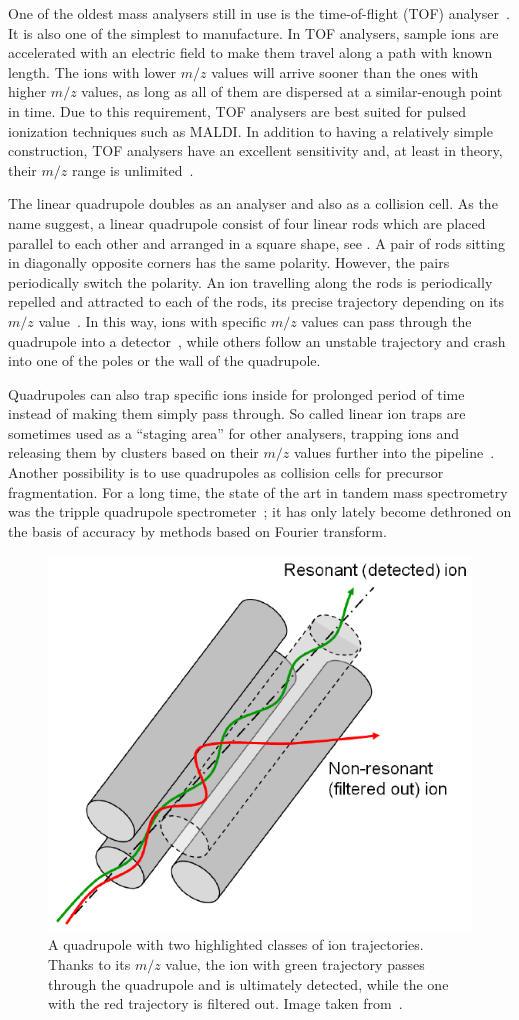 One of the oldest mass analysers still in use is the time-of-flight (TOF) analyser~\cite{stephens1946pulsed}. It is also one of the simplest to manufacture. In TOF analysers, sample ions are accelerated with an electric field to make them travel along a path with known length. The ions with lower \(m/z\) values will arrive sooner than the ones with higher \(m/z\) values, as long as all of them are dispersed at a similar-enough point in time. Due to this requirement, TOF analysers are best suited for pulsed ionization techniques such as MALDI\@. In addition to having a relatively simple construction, TOF analysers have an excellent sensitivity and, at least in theory, their \(m/z\) range is unlimited~\cite{fuerstenau1995molecular}.

The linear quadrupole doubles as an analyser and also as a collision cell. As the name suggest, a linear quadrupole consist of four linear rods which are placed parallel to each other and arranged in a square shape, see . A pair of rods sitting in diagonally opposite corners has the same polarity. However, the pairs periodically switch the polarity. An ion travelling along the rods is periodically repelled and attracted to each of the rods, its precise trajectory depending on its \(m/z\) value~\cite{paul1990electromagnetic}. In this way, ions with specific \(m/z\) values can pass through the quadrupole into a detector~\cite{paul1953neues}, while others follow an unstable trajectory and crash into one of the poles or the wall of the quadrupole.

Quadrupoles can also trap specific ions inside for prolonged period of time instead of making them simply pass through. So called linear ion traps are sometimes used as a ``staging area'' for other analysers, trapping ions and releasing them by clusters based on their \(m/z\) values further into the pipeline~\cite{mao2003h}. Another possibility is to use quadrupoles as collision cells for precursor fragmentation. For a long time, the state of the art in tandem mass spectrometry was the tripple quadrupole spectrometer~\cite{yost1978selected}; it has only lately become dethroned on the basis of accuracy by methods based on Fourier transform.

\begin{figure}
  \centering
  \includegraphics[width=.4\linewidth]{img/quadrupole.png}
  \caption{A quadrupole with two highlighted classes of ion trajectories. Thanks to its \(m/z\) value, the ion with green trajectory passes through the quadrupole and is ultimately detected, while the one with the red trajectory is filtered out. Image taken from~\citet{2021Mass}.}\label{fig:quadrupole}
\end{figure}

